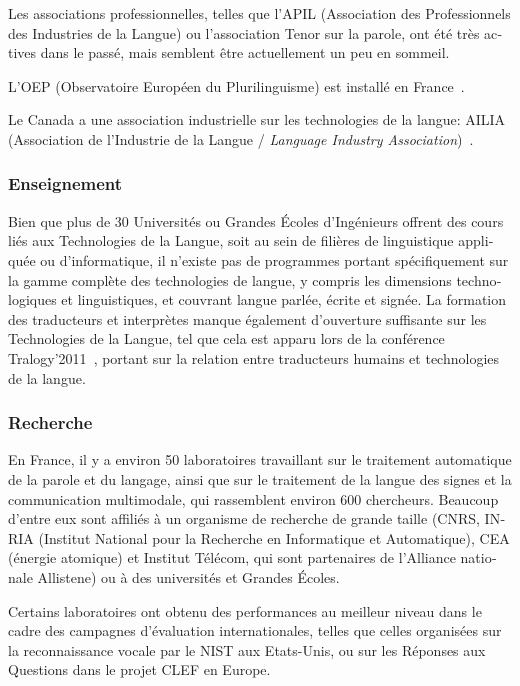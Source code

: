 \begin{french}
\begin{multicols}{2}
Les associations professionnelles, telles que l'APIL (Association des
Professionnels des Industries de la Langue) ou l'association Tenor sur
la parole, ont été très actives dans le passé, mais semblent être
actuellement un peu en sommeil.

L'OEP (Observatoire Européen du Plurilinguisme) est installé en France~\cite{OEP}.

Le Canada a une association industrielle sur les technologies de la langue: AILIA
(Association de l'Industrie de la Langue / {\em Language Industry
Association})~\cite{ailia}.

\subsubsection{Enseignement}
Bien que plus de 30 Universités ou Grandes Écoles d'Ingénieurs
offrent des cours liés aux Technologies de la Langue, soit au sein de
filières de linguistique appliquée ou d'informatique, il
n'existe pas de programmes portant spécifiquement sur la gamme
complète des technologies de langue, y compris les dimensions
technologiques et linguistiques, et couvrant langue parlée, écrite et
signée. La formation des traducteurs et interprètes manque également
d'ouverture suffisante sur les Technologies de la Langue, tel que cela
est apparu lors de la conférence Tralogy'2011~\cite{tralogy},
portant sur la relation entre traducteurs humains et technologies de
la langue.

\subsubsection{Recherche}

En France, il y a environ 50 laboratoires travaillant sur le traitement
automatique de la parole et du langage, ainsi que sur le traitement de
la langue des signes et la communication multimodale, qui
rassemblent environ 600 chercheurs. Beaucoup d'entre eux sont affiliés
à un organisme de recherche de grande taille (CNRS, INRIA (Institut
National pour la Recherche en Informatique et Automatique), CEA
(énergie atomique) et Institut Télécom, qui sont partenaires de
l'Alliance nationale Allistene) ou à des universités et Grandes Écoles.

Certains laboratoires ont obtenu des performances au meilleur niveau
dans le cadre des campagnes d'évaluation internationales, telles que
celles organisées sur la reconnaissance vocale par le NIST aux
Etats-Unis, ou sur les Réponses aux Questions dans le projet CLEF en
Europe.


\end{multicols}
\end{french}
